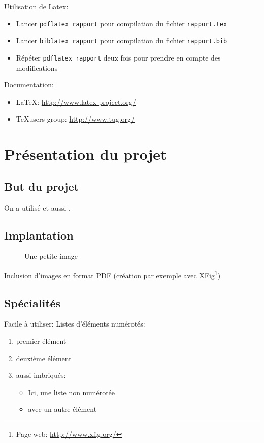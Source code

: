 \documentclass{article}
\begin{document}
Utilisation de Latex:
\begin{itemize}
\item Lancer \texttt{pdflatex rapport} pour compilation du fichier
  \texttt{rapport.tex}
\item Lancer \texttt{biblatex rapport} pour compilation du fichier
  \texttt{rapport.bib}
\item Répéter \texttt{pdflatex rapport} deux fois pour prendre en
  compte des modifications
\end{itemize}

Documentation:
\begin{itemize}
\item \LaTeX: \url{http://www.latex-project.org/}
\item \TeX users group: \url{http://www.tug.org/}
\end{itemize}


\section{Présentation du projet}

\subsection{But du projet}
On a utilisé
\cite{lindholm99_java_virtual_machin_specif,moore89_system_verif} et
aussi \cite{strecker02_verif_java_compil}.

\subsection{Implantation}

\begin{figure}[htbp]
  \centering
  \caption{Une petite image}
  \label{fig:im}
\end{figure}

Inclusion d'images en format PDF (création par exemple avec
XFig\footnote{Page web: \url{http://www.xfig.org/}})

\subsection{Spécialités}

Facile à utiliser: Listes d'éléments numérotés:
\begin{enumerate}
\item premier élément
\item deuxième élément
\item aussi imbriqués:
%
\begin{itemize}
\item Ici, une liste non numérotée
\item avec un autre élément
\end{itemize}
%
\end{enumerate}
\end{document}
